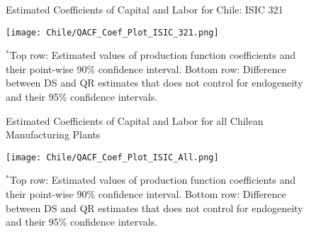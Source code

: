 \documentclass[12pt]{article}
\begin{document}
\begin{figure}[H]
\centering
\caption{Estimated Coefficients of Capital and Labor for Chile: ISIC 321}
\texttt{[image: Chile/QACF\_Coef\_Plot\_ISIC\_321.png]}
\caption*{\footnotesize $^{*}$Top row: Estimated values of production function coefficients and their point-wise 90\% confidence interval. Bottom row: Difference between DS and QR estimates that does not control for endogeneity and their 95\% confidence intervals.}
\label{fig:QACFCHL321}
\end{figure}

\begin{figure}[H]
\centering
\caption{Estimated Coefficients of Capital and Labor for all Chilean Manufacturing Plants}
\texttt{[image: Chile/QACF\_Coef\_Plot\_ISIC\_All.png]}
\caption*{\footnotesize $^{*}$Top row: Estimated values of production function coefficients and their point-wise 90\% confidence interval. Bottom row: Difference between DS and QR estimates that does not control for endogeneity and their 95\% confidence intervals.}
\label{fig:QACFCHLall}
\end{figure}
\end{document}

